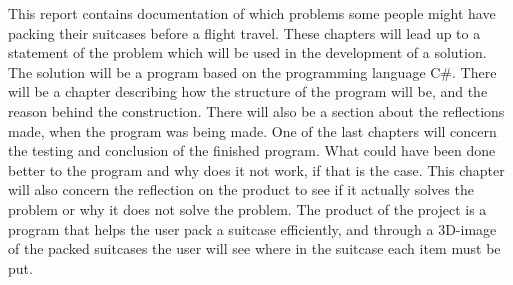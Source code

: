 This report contains documentation of which problems some people might have packing their suitcases before a flight travel. These chapters will lead up to a statement of the problem which will be used in the development of a solution.
\newline
The solution will be a program based on the programming language C#. There will be a chapter describing how the structure of the program will be, and the reason behind the construction. There will also be a section about the reflections made, when the program was being made.
\newline
One of the last chapters will concern the testing and conclusion of the finished program. What could have been done better to the program and why does it not work, if that is the case. This chapter will also concern the reflection on the product to see if it actually solves the problem or why it does not solve the problem.
\newline
The product of the project is a program that helps the user pack a suitcase efficiently, and through a 3D-image of the packed suitcases the user will see where in the suitcase each item must be put.